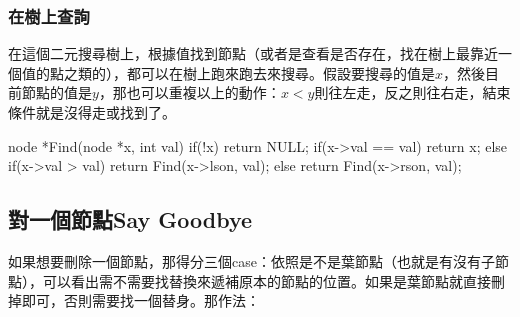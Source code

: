 \documentclass[main.tex]{subfiles}
\begin{document}
 \subsubsection{在樹上查詢}
 在這個二元搜尋樹上，根據值找到節點（或者是查看是否存在，找在樹上最靠近一個值的點之類的），都可以在樹上跑來跑去來搜尋。假設要搜尋的值是$x$，然後目前節點的值是$y$，那也可以重複以上的動作：$x < y$則往左走，反之則往右走，結束條件就是沒得走或找到了。
 \begin{C++}
node *Find(node *x, int val) {
    if(!x) return NULL;
    if(x->val == val) return x;
    else if(x->val > val) return Find(x->lson, val);
    else return Find(x->rson, val);
}
 \end{C++}
 \subsection{對一個節點Say Goodbye}
 如果想要刪除一個節點，那得分三個case：依照是不是葉節點（也就是有沒有子節點），可以看出需不需要找替換來遞補原本的節點的位置。如果是葉節點就直接刪掉即可，否則需要找一個替身。那作法：
 \begin{C++}
bool Delete(node *&root, node *x) {
 \end{C++}
\end{document}
